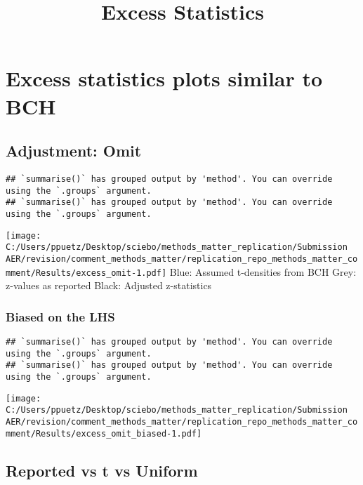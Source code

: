 \documentclass[
]{article}
\title{Excess Statistics}
\author{}
\date{\vspace{-2.5em}}
\begin{document}
\maketitle

\hypertarget{excess-statistics-plots-similar-to-bch}{%
\section{Excess statistics plots similar to
BCH}\label{excess-statistics-plots-similar-to-bch}}

\hypertarget{adjustment-omit}{%
\subsection{Adjustment: Omit}\label{adjustment-omit}}

\begin{verbatim}
## `summarise()` has grouped output by 'method'. You can override using the `.groups` argument.
## `summarise()` has grouped output by 'method'. You can override using the `.groups` argument.
\end{verbatim}

\texttt{[image: C:/Users/ppuetz/Desktop/sciebo/methods\_matter\_replication/Submission AER/revision/comment\_methods\_matter/replication\_repo\_methods\_matter\_comment/Results/excess\_omit-1.pdf]}
Blue: Assumed t-densities from BCH Grey: z-values as reported Black:
Adjusted z-statistics

\hypertarget{biased-on-the-lhs}{%
\subsubsection{Biased on the LHS}\label{biased-on-the-lhs}}

\begin{verbatim}
## `summarise()` has grouped output by 'method'. You can override using the `.groups` argument.
## `summarise()` has grouped output by 'method'. You can override using the `.groups` argument.
\end{verbatim}

\texttt{[image: C:/Users/ppuetz/Desktop/sciebo/methods\_matter\_replication/Submission AER/revision/comment\_methods\_matter/replication\_repo\_methods\_matter\_comment/Results/excess\_omit\_biased-1.pdf]}

\hypertarget{reported-vs-t-vs-uniform}{%
\subsection{Reported vs t vs Uniform}\label{reported-vs-t-vs-uniform}}
\end{document}
